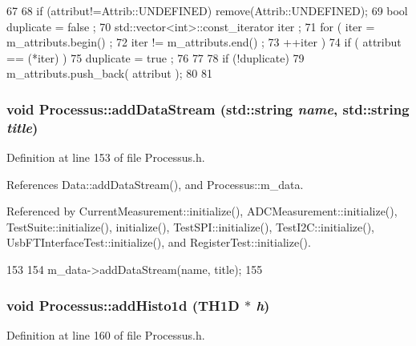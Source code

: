 \begin{DoxyCode}
67                             {
68     if (attribut!=Attrib::UNDEFINED) remove(Attrib::UNDEFINED);
69     bool duplicate = false ;
70     std::vector<int>::const_iterator iter ;
71     for ( iter  = m_attributs.begin() ;
72           iter != m_attributs.end()   ;
73           ++iter ) {
74       if ( attribut == (*iter) ) {
75         duplicate = true ;
76       }
77     }
78     if (!duplicate) {
79       m_attributs.push_back( attribut );
80     }
81   }
\end{DoxyCode}
\hypertarget{classProcessus_a308c8f193802f1d1ab49d4447d0cb281}{
\subsubsection[{addDataStream}]{\setlength{\rightskip}{0pt plus 5cm}void Processus::addDataStream (std::string {\em name}, \/  std::string {\em title})}}
\label{classProcessus_a308c8f193802f1d1ab49d4447d0cb281}


Definition at line 153 of file Processus.h.

References Data::addDataStream(), and Processus::m\_\-data.

Referenced by CurrentMeasurement::initialize(), ADCMeasurement::initialize(), TestSuite::initialize(), initialize(), TestSPI::initialize(), TestI2C::initialize(), UsbFTInterfaceTest::initialize(), and RegisterTest::initialize().


\begin{DoxyCode}
153                                                        {
154     m_data->addDataStream(name, title);
155   }
\end{DoxyCode}
\hypertarget{classProcessus_ad46e0d4dfdfdcbce001ee6be1746dfa4}{
\subsubsection[{addHisto1d}]{\setlength{\rightskip}{0pt plus 5cm}void Processus::addHisto1d (TH1D $\ast$ {\em h})}}
\label{classProcessus_ad46e0d4dfdfdcbce001ee6be1746dfa4}


Definition at line 160 of file Processus.h.


